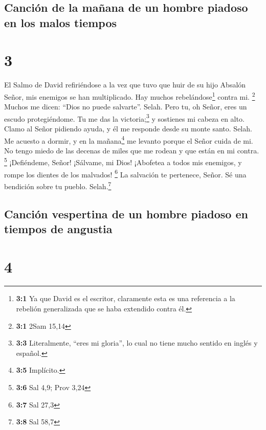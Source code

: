\hypertarget{canciuxf3n-de-la-mauxf1ana-de-un-hombre-piadoso-en-los-malos-tiempos}{%
\subsection{Canción de la mañana de un hombre piadoso en los malos
tiempos}\label{canciuxf3n-de-la-mauxf1ana-de-un-hombre-piadoso-en-los-malos-tiempos}}

\hypertarget{section-2}{%
\section{3}\label{section-2}}

El Salmo de David refiriéndose a la vez que tuvo que huir de su hijo
Absalón  Señor, mis enemigos se han multiplicado. Hay
muchos rebelándose\footnote{\textbf{3:1} Ya que David es el escritor,
  claramente esta es una referencia a la rebelión generalizada que se
  haba extendido contra él.} contra mi. \footnote{\textbf{3:1} 2Sam
  15,14}  Muchos me dicen: ``Dios no puede salvarte''.
Selah.  Pero tu, oh Señor, eres un escudo protegiéndome.
Tu me das la victoria;\footnote{\textbf{3:3} Literalmente, ``eres mi
  gloria'', lo cual no tiene mucho sentido en inglés y español.} y
sostienes mi cabeza en alto.  Clamo al Señor pidiendo
ayuda, y él me responde desde su monte santo. Selah.  Me
acuesto a dormir, y en la mañana\footnote{\textbf{3:5} Implícito.} me
levanto porque el Señor cuida de mi.  No tengo miedo de
las decenas de miles que me rodean y que están en mi contra. \footnote{\textbf{3:6}
  Sal 4,9; Prov 3,24}  ¡Defiéndeme, Señor! ¡Sálvame, mi
Dios! ¡Abofetea a todos mis enemigos, y rompe los dientes de los
malvados! \footnote{\textbf{3:7} Sal 27,3}  La salvación
te pertenece, Señor. Sé una bendición sobre tu pueblo. Selah.\footnote{\textbf{3:8}
  Sal 58,7}

\hypertarget{canciuxf3n-vespertina-de-un-hombre-piadoso-en-tiempos-de-angustia}{%
\subsection{Canción vespertina de un hombre piadoso en tiempos de
angustia}\label{canciuxf3n-vespertina-de-un-hombre-piadoso-en-tiempos-de-angustia}}

\hypertarget{section-3}{%
\section{4}\label{section-3}}

